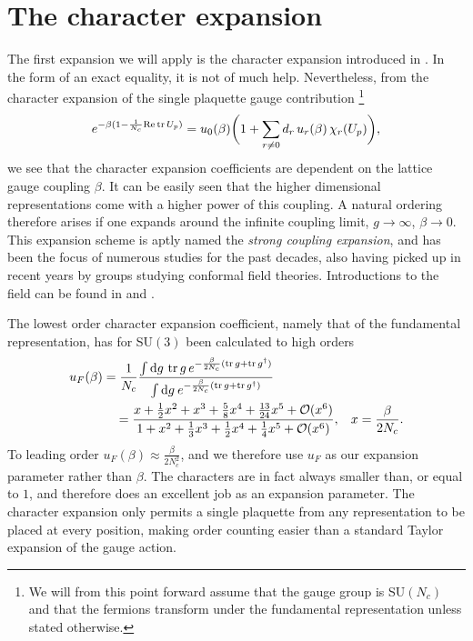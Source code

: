 \section{The character expansion} \label{sec:char_exp}

The first expansion we will apply is the character expansion introduced in 
. In the form of an exact equality, it is not of much
help. Nevertheless, from the character expansion of the single plaquette gauge
contribution
\footnote{We will from this point forward assume that the gauge group is SU$(N_c)$
  and that the fermions transform under the fundamental representation unless
  stated otherwise.}
%
\begin{equation}
  e^{-\beta (1 - \frac{1}{N_c} \text{Re} \operatorname{tr} U_p)} = u_0(\beta) \bigg(1 +
  \sum_{r \neq 0} d_r\, u_r(\beta)\, \chi_r(U_p) \bigg),
\end{equation}
%
we see that the character expansion coefficients are dependent on the lattice
gauge coupling $\beta$. It can be easily seen that the higher dimensional
representations come with a higher power of this coupling. A natural ordering
therefore arises if one expands around the infinite coupling limit, $g\to\infty$,
$\beta\to0$. This expansion scheme is aptly named the \emph{strong coupling
  expansion}, and has been the focus of numerous studies for the past decades,
also having picked up in recent years by groups studying conformal field
theories. Introductions to the field can be found in \cite{Drouffe:1983fv} and
\cite{montvay1997quantum}.

The lowest order character expansion coefficient, namely that of the fundamental
representation, has for SU$(3)$ been calculated to high orders
%
\begin{align}
  u_F(\beta) &= \frac{1}{N_c} \frac{\int \mathrm{d} g\, \tr g\, e^{-\frac{\beta}{2 N_c}
    ( \tr g + \tr g^{\dagger})}}{\int \mathrm{d} g\: e^{-\frac{\beta}{2 N_c}
    ( \tr g + \tr g^{\dagger})}} \nonumber\\
  &\hskip1em= \frac{
    x + \frac{1}{2} x^2 + x^3 + \frac{5}{8} x^4 + \frac{13}{24} x^5 + \mathcal{O}(x^6)%
  }{%
    1 + x^2 + \frac{1}{3} x^3 + \frac{1}{2} x^4 + \frac{1}{4} x^5 + \mathcal{O}(x^6)%
  }, \hskip2ex x=\frac{\beta}{2 N_c}.
\end{align}
%
To leading order $u_F(\beta) \approx \frac{\beta}{2 N_c^2}$, and we
therefore use $u_F$ as our expansion parameter rather than $\beta$.
The characters are in fact always smaller than, or equal to $1$, and therefore
does an excellent job as an expansion parameter.  The character expansion only
permits a single plaquette from any representation to be placed at every
position, making order counting easier than a standard Taylor expansion of the
gauge action.

